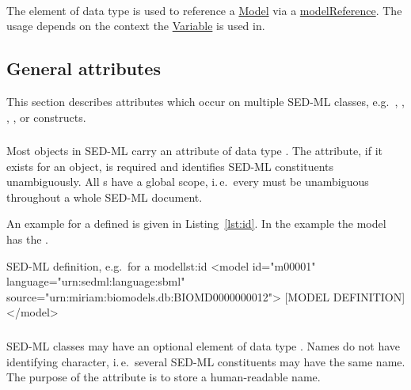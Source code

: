 \paragraph*{}
\label{sec:modelReferenceAttribute}
The  element of data type \hyperref[type:sidref]{} is used to reference a \hyperref[class:model]{Model} via a \hyperref[sec:modelReference]{modelReference}. The usage depends on the context the \hyperref[class:variable]{Variable} is used in.


\subsection{General attributes}
This section describes attributes which occur on multiple SED-ML classes, e.g.\ \hyperref[sec:id]{}, \hyperref[sec:name]{}, \hyperref[sec:math]{}, \hyperref[sec:kisaoid]{}, or \hyperref[sec:listOf]{} constructs.
\label{sec:generalAttributes}

\subsubsection{}
\label{sec:id}
Most objects in SED-ML carry an  attribute of data type \hyperref[type:sid]{}. The  attribute, if it exists for an object, is required and identifies SED-ML constituents unambiguously. All s have a global scope, i.\,e.\ every  must be unambiguous throughout a whole SED-ML document.

An example for a defined  is given in Listing~\ref{lst:id}. In the example the model has the  .

\begin{myXmlLst}{SED-ML  definition, e.g.\ for a model}{lst:id}
<model id="m00001" language="urn:sedml:language:sbml" source="urn:miriam:biomodels.db:BIOMD0000000012">
	[MODEL DEFINITION]
</model>
\end{myXmlLst}


\subsubsection{}
\label{sec:name}
SED-ML classes may have an optional element  of data type . Names do not have identifying character, i.\,e.\ several SED-ML constituents may have the same name. The purpose of the  attribute is to store a human-readable name.

